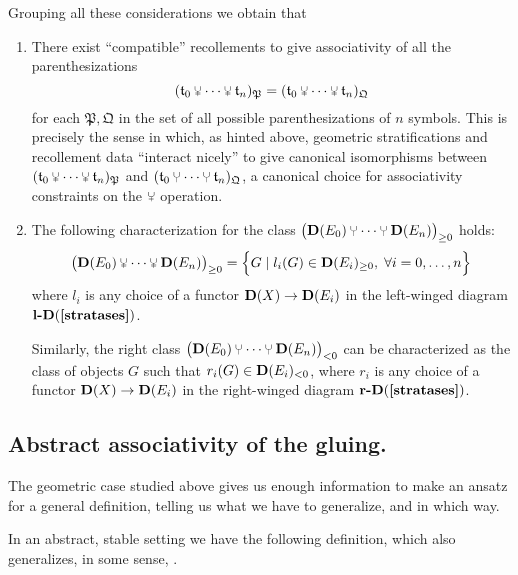 Grouping all these considerations we obtain that
\begin{enumerate}
\item There exist ``compatible'' recollements to give associativity of all the parenthesizations
\[
	(\tee_0\glue \cdots\glue \tee_n)_\mathfrak{P}=(\tee_0\glue \cdots\glue \tee_n)_\mathfrak{Q}
\]
for each $\mathfrak P, \mathfrak Q$ in the set of all possible parenthesizations of $n$ symbols. This is precisely the sense in which, as hinted above, geometric stratifications and recollement data ``interact nicely'' to give canonical isomorphisms between $(\tee_0\glue \cdots\glue \tee_n)_\mathfrak{P}$ and $(\tee_0\glue \cdots\glue \tee_n)_\mathfrak{Q}$, \ie a canonical choice for associativity constraints on the $\glue$ operation.
\item The following characterization for the class $\big( \D(E_0)\glue \cdots \glue \D(E_n)\big)_{\ge 0}$ holds:
\[
	\big( \D(E_0)\glue \cdots \glue \D(E_n)\big)_{\ge 0} =
	\Big\{
	  G \mid l_i(G)\in \D(E_i)_{\ge 0}, \hspace{1mm} \forall i=0,\dots,n
	\Big\}
\]
where $l_i$ is any choice of a functor $\textbf{D}(X)\to \textbf{D}(E_i)$ in the left\hyp{}winged diagram $\textbf{l-}\D(\refbf{stratases})$.

Similarly, the right class $\big( \D(E_0)\glue \cdots \glue \D(E_n)\big)_{< 0} $ can be characterized as the class of objects $G$ such that $r_i(G)\in \textbf{D}(E_i)_{< 0}$, where $r_i$ is any choice of a functor $\textbf{D}(X)\to \textbf{D}(E_i)$ in the right\hyp{}winged diagram $\textbf{r-}\D(\refbf{stratases})$.
\end{enumerate}
\subsection{Abstract associativity of the gluing.}\label{abstractassoc}
The geometric case studied above gives us enough information to make an ansatz for a general definition, telling us what we have to generalize, and in which way. 

In an abstract, stable setting we have the following definition, which also generalizes, in some sense, .

